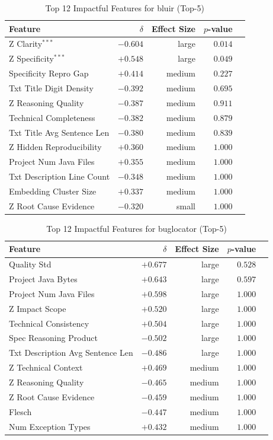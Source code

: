 \begin{table}[h]
\centering
\caption{Top 12 Impactful Features for bluir (Top-5)}
\label{tab:tool_features_bluir_top5}
\begin{tabular}{lrrrr}
\toprule
Feature & $\delta$ & Effect Size & $p$-value \\
\midrule
Z Clarity$^{***}$ & $-0.604$ & large & $0.014$ \\
Z Specificity$^{***}$ & $+0.548$ & large & $0.049$ \\
Specificity Repro Gap & $+0.414$ & medium & $0.227$ \\
Txt Title Digit Density & $-0.392$ & medium & $0.695$ \\
Z Reasoning Quality & $-0.387$ & medium & $0.911$ \\
Technical Completeness & $-0.382$ & medium & $0.879$ \\
Txt Title Avg Sentence Len & $-0.380$ & medium & $0.839$ \\
Z Hidden Reproducibility & $+0.360$ & medium & $1.000$ \\
Project Num Java Files & $+0.355$ & medium & $1.000$ \\
Txt Description Line Count & $-0.348$ & medium & $1.000$ \\
Embedding Cluster Size & $+0.337$ & medium & $1.000$ \\
Z Root Cause Evidence & $-0.320$ & small & $1.000$ \\
\bottomrule
\end{tabular}
\end{table}

\begin{table}[h]
\centering
\caption{Top 12 Impactful Features for buglocator (Top-5)}
\label{tab:tool_features_buglocator_top5}
\begin{tabular}{lrrrr}
\toprule
Feature & $\delta$ & Effect Size & $p$-value \\
\midrule
Quality Std & $+0.677$ & large & $0.528$ \\
Project Java Bytes & $+0.643$ & large & $0.597$ \\
Project Num Java Files & $+0.598$ & large & $1.000$ \\
Z Impact Scope & $+0.520$ & large & $1.000$ \\
Technical Consistency & $+0.504$ & large & $1.000$ \\
Spec Reasoning Product & $-0.502$ & large & $1.000$ \\
Txt Description Avg Sentence Len & $-0.486$ & large & $1.000$ \\
Z Technical Context & $+0.469$ & medium & $1.000$ \\
Z Reasoning Quality & $-0.465$ & medium & $1.000$ \\
Z Root Cause Evidence & $-0.459$ & medium & $1.000$ \\
Flesch & $-0.447$ & medium & $1.000$ \\
Num Exception Types & $+0.432$ & medium & $1.000$ \\
\bottomrule
\end{tabular}
\end{table}

